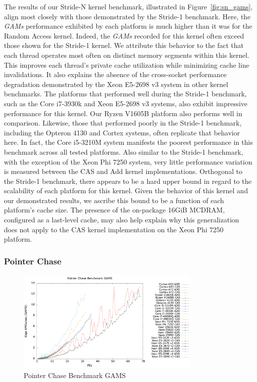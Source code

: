 The results of our Stride-N kernel benchmark, illustrated in Figure~\ref{fig:sn_gams}, align most closely with those demonstrated by the Stride-1 benchmark.
Here, the \textit{GAMs} performance exhibited by each platform is much higher than it was for the Random Access kernel.
Indeed, the \textit{GAMs} recorded for this kernel often exceed those shown for the Stride-1 kernel.
We attribute this behavior to the fact that each thread operates most often on distinct memory segments within this kernel.
This improves each thread's private cache utilization while minimizing cache line invalidations.
It also explains the absence of the cross-socket performance degradation demonstrated by the Xeon E5-2698 v3 system in other kernel benchmarks.
The platforms that performed well during the Stride-1 benchmark, such as the Core i7-3930k and Xeon E5-2698 v3 systems, also exhibit impressive performance for this kernel.
Our Ryzen V1605B platform also performs well in comparison.
Likewise, those that performed poorly in the Stride-1 benchmark, including the Opteron 4130 and Cortex systems, often replicate that behavior here.
In fact, the Core i5-3210M system manifests the poorest performance in this benchmark across all tested platforms.
Also similar to the Stride-1 benchmark, with the exception of the Xeon Phi 7250 system, very little performance variation is measured between the CAS and Add kernel implementations.
Orthogonal to the Stride-1 benchmark, there appears to be a hard upper bound in regard to the scalability of each platform for this kernel.
Given the behavior of this kernel and our demonstrated results, we ascribe this bound to be a function of each platform's cache size.
The presence of the on-package 16GiB MCDRAM, configured as a last-level cache, may also help explain why this generalization does not apply to the CAS kernel implementation on the Xeon Phi 7250 platform.

\subsubsection{Pointer Chase}
\label{subsubsec:ptrchase_res}

\begin{figure}[!t]
\centering
\includegraphics[width=3.5in]{figures/PTRCHASE_GAMS.png}
\caption{Pointer Chase Benchmark GAMS}
\label{fig:ptrchase_gams}
\end{figure}

